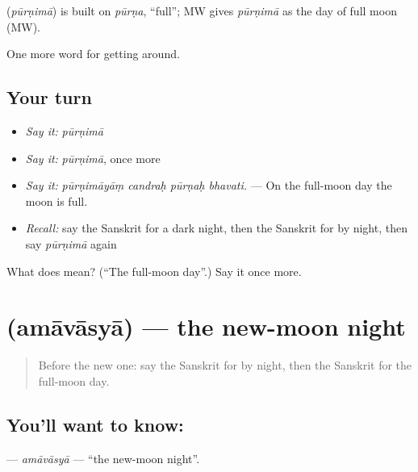 \begin{cousinweb}
\textbf{} (\emph{pūrṇimā}) is built on \emph{pūrṇa}, \textquotedblleft{}full\textquotedblright{}; MW gives \emph{pūrṇimā} as the day of full moon (MW).
\end{cousinweb}

\begin{grammarlens}[title={What you've built}]
One more word for getting around.
\end{grammarlens}

\subsection*{Your turn}
\begin{itemize}
\raggedright
  \item \emph{Say it:} \emph{pūrṇimā}
  \item \emph{Say it:} \emph{pūrṇimā}, once more
  \item \emph{Say it:} \emph{pūrṇimāyāṃ candraḥ pūrṇaḥ bhavati.} — On the full-moon day the moon is full.
  \item \emph{Recall:} say the Sanskrit for a dark night, then the Sanskrit for by night, then say \emph{pūrṇimā} again
\end{itemize}

\begin{tcolorbox}[breakable,colback=teal!4,colframe=teal!35!black,title={Before you move on}]
What does  mean? (\textquotedblleft{}The full-moon day\textquotedblright{}.) Say it once more.
\end{tcolorbox}
\section[\texorpdfstring{\sk{अमावास्या} (amāvāsyā)}{अमावास्या (amāvāsyā)}]{ (amāvāsyā) — the new-moon night}

\label{lesson:SA-C444-amavasya}



\begin{quote}
Before the new one: say the Sanskrit for by night, then the Sanskrit for the full-moon day.
\end{quote}

\subsection*{You'll want to know: }
\textbf{} — \emph{amāvāsyā} — \textquotedblleft{}the new-moon night\textquotedblright{}.

